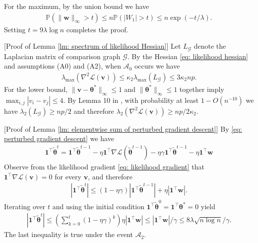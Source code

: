 \documentclass[letterpaper,12pt]{article}
\numberwithin{equation}{section}
\theoremstyle{plain}
\numberwithin{Theorem}{section}
\numberwithin{corollary}{section}
\numberwithin{proposition}{section}
\numberwithin{Lemma}{section}
{
	\theoremstyle{definition}
	\newtheorem{Definition}{Definition}
	\newtheorem{example}{Example}
	\numberwithin{example}{section}
	\newtheorem{fact}{Fact}
	\numberwithin{fact}{section}
	\newtheorem{remark}{Remark}
}
\newcommand{\Pro}{\mathbb{P}}
\newcommand{\1}{\mathbbm{1}}
\def\bth{{\boldsymbol{\theta}}}
\begin{document}
	For the maximum, by the union bound we have
	\begin{align*}
		\Pro(\|\bm w\|_\infty > t) \leq n\Pro(|W_1| > t) \leq n\exp(-t/\lambda).
	\end{align*}
	Setting $t = 9\lambda\log n$ completes the proof.


[Proof of Lemma \ref{lm: spectrum of likelihood Hessian}]
	Let $L_{\mathcal{G}}$ denote the Laplacian matrix of comparison graph $\mathcal G$. By the Hessian \eqref{eq: likelihood hessian} and assumptions (A0) and (A2), when $\mathcal A_0$ occurs we have 
	\begin{align*}
		\lambda_{\max} (\nabla^2 \mathcal L(\bm v)) \leq \kappa_2\lambda_{\max}(L_{\mathcal G}) \leq 3\kappa_2 np.
	\end{align*}
	For the lower bound, $\|\bm v - \bth^*\|_\infty \leq 1$ and $\|\bth^*\|_\infty \leq 1$ together imply $\max_{i,j}|v_i - v_j| \leq 4$. By Lemma 10 in \cite{chen2019spectral}, with probability at least $1 - O(n^{-10})$ we have $\lambda_2(L_{\mathcal G}) \geq np/2$ and therefore $\lambda_{2} (\nabla^2 \mathcal L(\bm v)) \geq np/2\kappa_2$.


[Proof of Lemma \ref{lm: elementwise sum of perturbed gradient descent}]
	By \eqref{eq: perturbed gradient descent} we have
	\begin{align*}
		\bm 1^\top\widetilde\bth^t = \bm 1^\top\widetilde\bth^{t-1} - \eta\bm 1^\top\nabla\mathcal L(\widetilde\bth^{t-1}) - \eta\gamma\bm 1^\top\widetilde\bth^{t-1} - \eta\bm1^\top\bm w
	\end{align*}
	Observe from the likelihood gradient \eqref{eq: likelihood gradient} that $\bm 1^\top \nabla\mathcal L(\bm v) = 0$ for every $\bm v$, and therefore
	\begin{align*}
		|\bm 1^\top\widetilde\bth^t| \leq (1-\eta\gamma)|\bm 1^\top\widetilde\bth^{t-1}| + \eta|\bm 1^\top\bm w|.
	\end{align*}
	Iterating over $t$ and using the initial condition $\bm 1^\top \widetilde\bth^0 = \bm 1^\top\bth^* = 0$ yield
	\begin{align*}
		|\bm 1^\top\widetilde\bth^t| \leq \left(\sum_{k=0}^t (1-\eta\gamma)^k \right) \eta |\bm 1^\top\bm w| \leq |\bm 1^\top\bm w|/\gamma \leq 8\lambda\sqrt{n\log n}/\gamma.
	\end{align*}
	The last inequality is true under the event $\mathcal A_2$.
\end{document}
